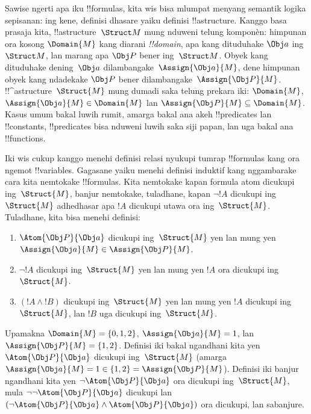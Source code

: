 \documentclass[../../../include/open-logic-section]{subfiles}
\begin{document}


Sawise ngerti apa iku !!{formula}s, kita wis bisa mlumpat menyang
semantik logika sepisanan: ing kene, definisi dhasare yaiku definisi
!!a{structure}. Kanggo basa prasaja kita, !!a{structure}~$\Struct M$
mung nduweni telung komponèn: himpunan ora kosong $\Domain{M}$ kang
diarani \emph{!!{domain}}, apa kang dituduhake $\Obj a$ ing~$\Struct
M$, lan marang apa $\Obj P$ bener ing~$\Struct M$. Obyek kang
dituduhake dening~$\Obj a$ dilambangake~$\Assign{\Obj a}{M}$, dene
himpunan obyek kang ndadekake $\Obj P$ bener dilambangake~$\Assign{\Obj
P}{M}$. !!^a{structure}~$\Struct{M}$ mung dumadi saka telung prekara
iki: $\Domain{M}$, $\Assign{\Obj a}{M} \in \Domain{M}$ lan
$\Assign{\Obj P}{M} \subseteq \Domain{M}$. Kasus umum bakal luwih
rumit, amarga bakal ana akeh !!{predicate}s lan !!{constant}s,
!!{predicate}s bisa nduweni luwih saka siji papan, lan uga bakal ana
!!{function}s.

Iki wis cukup kanggo menehi definisi relasi nyukupi tumrap !!{formula}s
kang ora ngemot !!{variable}s. Gagasane yaiku menehi definisi induktif
kang nggambarake cara kita nemtokake !!{formula}s. Kita nemtokake kapan
formula atom dicukupi ing~$\Struct{M}$, banjur nemtokake, tuladhane,
kapan $\lnot !A$ dicukupi ing~$\Struct{M}$ adhedhasar apa $!A$
dicukupi utawa ora ing~$\Struct{M}$. Tuladhane, kita bisa menehi
definisi:
\begin{enumerate}
  \item $\Atom{\Obj P}{\Obj a}$ dicukupi ing~$\Struct{M}$ yen lan mung yen
  $\Assign{\Obj a}{M} \in \Assign{\Obj P}{M}$.
  \item $\lnot !A$ dicukupi ing~$\Struct{M}$ yen lan mung yen $!A$ ora
  dicukupi ing~$\Struct{M}$.
  \item $(!A \land !B)$ dicukupi ing~$\Struct{M}$ yen lan mung yen $!A$
  dicukupi ing~$\Struct{M}$, lan $!B$ uga dicukupi ing~$\Struct{M}$.
\end{enumerate}
Upamakna $\Domain{M} = \{0, 1, 2\}$, $\Assign{\Obj a}{M} = 1$,
lan $\Assign{\Obj P}{M} = \{1, 2\}$. Definisi iki bakal ngandhani kita
yen $\Atom{\Obj P}{\Obj a}$ dicukupi ing~$\Struct{M}$ (amarga
$\Assign{\Obj a}{M} =  1 \in \{1,2\} = \Assign{\Obj P}{M}$). Definisi
iki banjur ngandhani kita yen $\lnot \Atom{\Obj P}{\Obj a}$ ora
dicukupi ing~$\Struct{M}$, mula $\lnot\lnot \Atom{\Obj P}{\Obj a}$
dicukupi lan $(\lnot \Atom{\Obj P}{\Obj a} \land \Atom{\Obj P}{\Obj
a})$ ora dicukupi, lan sabanjure.
\end{document}
